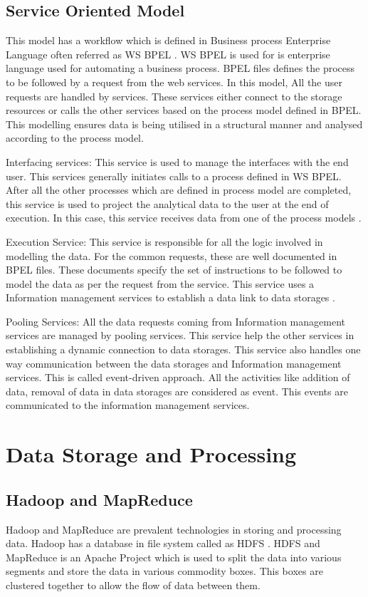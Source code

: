 \documentclass[sigconf]{acmart}
\begin{document}
\subsection{Service Oriented Model}

 This model has a workflow which is defined in Business process Enterprise Language often referred as WS BPEL \cite{WSBPEL}. WS BPEL is used for is enterprise language used for automating a business process. BPEL files defines the process to be followed by a request from the web services. In this model, All the user requests are handled by services. These services either connect to the storage resources or calls the other services based on the process model defined in BPEL. This modelling ensures data is being utilised in a structural manner and analysed according to the process model.

Interfacing services: 
This service is used to manage the interfaces with the end user. This services generally initiates calls to a process defined in WS BPEL. After all the other processes which are defined in process model are completed, this service is used to project the analytical data to the user at the end of execution. In this case, this service receives data from one of the process models \cite{Pathak}.

Execution Service:
This service is responsible for all the logic involved in modelling the data. For the common requests, these are well documented in BPEL files. These documents specify the set of instructions to be followed to model the data as per the request from the service. This service uses a Information management services to establish a data link to data storages \cite{Pathak}.

Pooling Services:
All the data requests coming from Information management services are  managed by pooling services. This service help the other services in establishing a dynamic connection to data storages. This service also handles one way communication between the data storages and Information management services. This is called event-driven approach. All the activities like addition of data, removal of data  in data storages are considered as event. This events are communicated to the information management services. 

\section{Data Storage and Processing}
\subsection{Hadoop and MapReduce}
Hadoop and MapReduce are prevalent technologies in storing and processing data. Hadoop has a database in file system called as HDFS \cite{hadoop}. HDFS and MapReduce is an Apache Project which is used to split the data into various segments and store the data in various commodity boxes. This boxes are clustered together to allow the flow of data between them.
\end{document}
